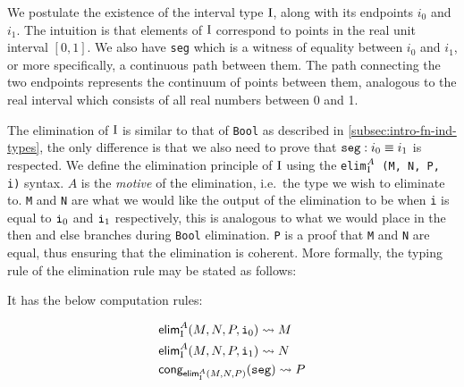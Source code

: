 \documentclass[12pt,twoside,maitrise]{dms}
\theoremstyle{definition}
\numberwithin{equation}{section}
\numberwithin{table}{chapter}
\numberwithin{figure}{chapter}
\newcommand\kw[1] {\textsf{#1}}
\newcommand\id[1] {\texttt{#1}}
\newcommand\fn[1] {\texttt{#1}}
\begin{document}
We postulate the existence of the interval type $\mathrm{I}$, along with its endpoints
\id{$i_0$} and \id{$i_1$}. The intuition is that elements of $\mathrm{I}$ correspond
to points in the real unit interval $[0, 1]$. We also have \id{seg} which is a
witness of equality between \id{$i_0$} and \id{$i_1$}, or more specifically, a
continuous path between them. The path connecting the two endpoints represents
the continuum of points between them, analogous to the real interval which
consists of all real numbers between 0 and 1.

The elimination of $\mathrm{I}$ is similar to that of \id{Bool} as described in
\autoref{subsec:intro-fn-ind-types}, the only difference is that we also need
to prove that $\id{seg} : \eqtype{i_0}{i_1}$ is respected. We define the
elimination principle of $\mathrm{I}$ using the \fn{elim$_{\mathrm{I}}^{A}$ (M, N, P, i)}
syntax. $A$ is the \emph{motive} of the elimination, i.e.\ the type we wish to
eliminate to. \id{M} and \id{N} are what we would like the output of the
elimination to be when \id{i} is equal to $\ileft$ and $\iright$ respectively,
this is analogous to what we would place in the \kw{then} and \kw{else}
branches during \id{Bool} elimination. \id{P} is a proof that \id{M} and
\id{N} are equal, thus ensuring that the elimination is coherent. More
formally, the typing rule of the elimination rule may be stated as follows:

\begin{prooftree*}
   \infer3{\oftype{\ctx, \oftype{i}{\bI}}{\kw{elim}_{\bI}^{A} (M, N, P, i)}{A}}
\end{prooftree*}

It has the below computation rules:

\begin{align*}
  & \kw{elim}_{\bI}^{A}(M, N, P, \ileft) \leadsto{} M \\
  & \kw{elim}_{\bI}^{A}(M, N, P, \iright) \leadsto{} N \\
  & \kw{cong}_{\kw{elim}_{\bI}^{A}(M, N, P)}(\id{seg}) \leadsto{} P
\end{align*}
\end{document}
